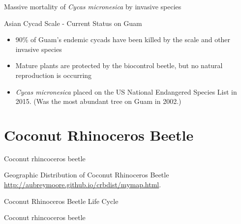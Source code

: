 \documentclass[]{beamer}
\begin{document}
\begin{frame}{Massive mortality of \textit{Cycas micronesica} by invasive species}
\end{frame}

\begin{frame}{Asian Cycad Scale - Current Status on Guam}
	\begin{itemize}
		\item 90\% of Guam's endemic cycads have been killed by the scale and other invasive species
		\item Mature plants are protected by the biocontrol beetle, but no natural reproduction is occurring
		\item \textit{Cycas micronesica} placed on the US National Endangered Species List in 2015. (Was the most abundant tree on Guam in 2002.)
	\end{itemize}
\end{frame}

\section{Coconut Rhinoceros Beetle}

\begin{frame}{Coconut rhincoceros beetle}
\end{frame}

\begin{frame}{Geographic Distribution of Coconut Rhinoceros Beetle}
 \\
\url{http://aubreymoore.github.io/crbdist/mymap.html}.
\end{frame}

\begin{frame}{Coconut Rhinoceros Beetle Life Cycle}
\end{frame}

\begin{frame}{Coconut rhincoceros beetle}
\end{frame}
\end{document}
